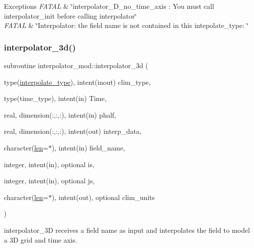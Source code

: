 \begin{DoxyExceptions}{Exceptions}
{\em F\+A\+T\+AL} & \char`\"{}interpolator\+\_\+D\+\_\+no\+\_\+time\+\_\+axis \+: You must call
                interpolator\+\_\+init before calling interpolator\char`\"{} \\
\hline
{\em F\+A\+T\+AL} & \char`\"{}\+Interpolator\+: the field name is not contained in this
                intepolate\+\_\+type\+: \char`\"{} \\
\hline
\end{DoxyExceptions}
\mbox{\label{namespaceinterpolator__mod_ab04eaf1ed57ea3a211ee4f99a3485ab3}} 
\subsubsection{\texorpdfstring{interpolator\+\_\+3d()}{interpolator\_3d()}}
{\footnotesize\ttfamily subroutine interpolator\+\_\+mod\+::interpolator\+\_\+3d (\begin{DoxyParamCaption}\item[{type(\hyperlink{structinterpolator__mod_1_1interpolate__type}{interpolate\+\_\+type}), intent(inout)}]{clim\+\_\+type,  }\item[{type(time\+\_\+type), intent(in)}]{Time,  }\item[{real, dimension(\+:,\+:,\+:), intent(in)}]{phalf,  }\item[{real, dimension(\+:,\+:,\+:), intent(out)}]{interp\+\_\+data,  }\item[{character(\hyperlink{namespaceinterpolator__mod_a6bd2ec3395203e1b6aba0610bfbfe16b}{len}=$\ast$), intent(in)}]{field\+\_\+name,  }\item[{integer, intent(in), optional}]{is,  }\item[{integer, intent(in), optional}]{js,  }\item[{character(\hyperlink{namespaceinterpolator__mod_a6bd2ec3395203e1b6aba0610bfbfe16b}{len}=$\ast$), intent(out), optional}]{clim\+\_\+units }\end{DoxyParamCaption})\hspace{0.3cm}{\ttfamily [private]}}



interpolator\+\_\+3D receives a field name as input and interpolates the field to model a 3D grid and time axis. 


